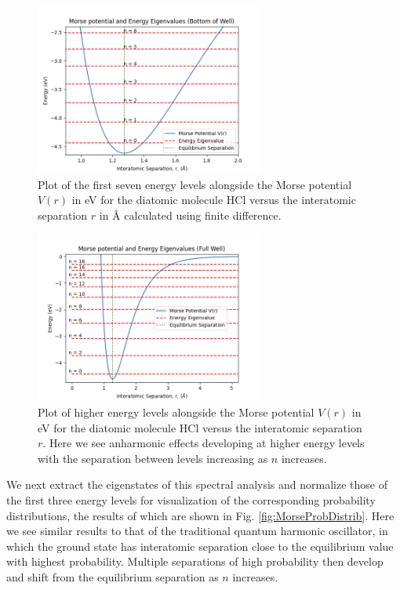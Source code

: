 \documentclass[%
aps, %
prl, %
preprint, %
12pt, %
amsfonts, %
amssymb, %
amsmath, %
endfloats,%
raggedbottom, %
]{revtex4-1}
\begin{document}
\begin{figure}
\centering
\includegraphics[width=0.67\textwidth]{lower_well_morse_energies.png}
\caption{\label{fig:MorseLowEnergies} Plot of the first seven energy levels alongside the Morse
potential $V(r)$ in eV for the diatomic molecule HCl versus the interatomic separation $r$ in Å
calculated using finite difference.}
\end{figure}

\begin{figure}
\centering
\includegraphics[width=0.67\textwidth]{full_morse_and_energies.png}
\caption{\label{fig:MorseFullSpectrum} Plot of higher energy levels alongside the Morse
potential $V(r)$ in eV for the diatomic molecule HCl versus the interatomic separation $r$. Here we see
anharmonic effects developing at higher energy levels with the separation between levels increasing as
$n$ increases.}
\end{figure}

We next extract the eigenstates of this spectral analysis and normalize those of the first three energy
levels for visualization of the corresponding probability distributions, the results of which are shown
in Fig. \ref{fig:MorseProbDistrib}. Here we see similar results to that of the traditional quantum
harmonic oscillator, in which the ground state has interatomic separation close to the equilibrium value
with highest probability. Multiple separations of high probability then develop and shift from the
equilibrium separation as $n$ increases.
\end{document}
